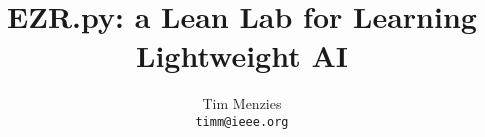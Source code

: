 \documentclass[twocolumn]{article}
\title{EZR.py: a Lean Lab for Learning Lightweight AI}
\author{Tim Menzies\\{\tt timm@ieee.org}}
\date{}
\begin{document}
\maketitle



\inputminted{python}{lite.py}
\end{document}
